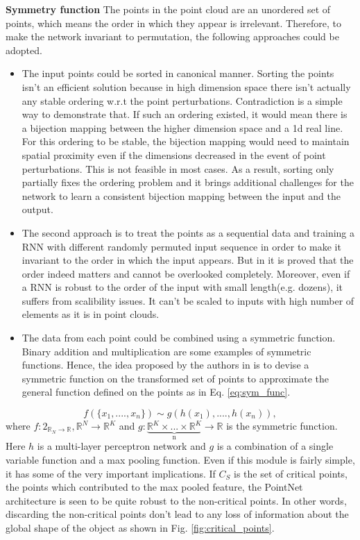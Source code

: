\textbf{Symmetry function} The points in the point cloud are an unordered set of points, which means the order in which they appear is irrelevant. Therefore, to make the network invariant to permutation, the following approaches could be adopted. 
\begin{itemize}
    \item The input points could be sorted in canonical manner. Sorting the points isn't an efficient solution because in high dimension space there isn't actually any stable ordering w.r.t the point perturbations. Contradiction is a simple way to demonstrate that. If such an ordering existed, it would mean there is a bijection mapping between the higher dimension space and a 1d real line. For this ordering to be stable, the bijection mapping would need to maintain spatial proximity even if the dimensions decreased in the event of point perturbations. This is not feasible in most cases. As a result, sorting only partially fixes the ordering problem and it brings additional challenges for the network to learn a consistent bijection mapping between the input and the output.\cite{mei2022unsupervised}
    \item The second approach is to treat the points as a sequential data and training a \ac{RNN} with different randomly permuted input sequence in order to make it invariant to the order in which the input appears. But in \cite{vinyals2015order} it is proved that the order indeed matters and cannot be overlooked completely. Moreover, even if a \ac{RNN} is robust to the order of the input with small length(e.g. dozens), it suffers from scalibility issues. It can't be scaled to inputs with high number of elements as it is in point clouds.\cite{mei2022unsupervised}
    \item The data from each point could be combined using a symmetric function. Binary addition and multiplication are some examples of symmetric functions. Hence, the idea proposed by the authors in \cite{qi2017pointnet} is to devise a symmetric function on the transformed set of points to approximate the general function defined on the points as in Eq. \ref{eq:sym_func}.\cite{mei2022unsupervised}
\end{itemize}
   
\begin{equation}
    \label{eq:sym_func}
    f(\{x_1, ...., x_n\}) \sim g(h(x_1), ...., h(x_n)),
\end{equation}
where $\mathit{f}: 2_{\mathbb{R}_{\mathit{N}} \rightarrow \mathbb{R}}, \mathbb{R}^{\mathit{N}} \rightarrow \mathbb{R}^{\mathit{K}}$ and $g: \underbrace{\mathbb{R}^{\mathit{K}} \times ... \times \mathbb{R}^{\mathit{K}}}_\text{n} \rightarrow \mathbb{R}$ is the symmetric function. Here $h$ is a multi-layer perceptron network and $g$ is a combination of a single variable function and a max pooling function. Even if this module is fairly simple, it has some of the very important implications. If $\mathit{C_S}$ is the set of critical points, the points which contributed to the max pooled feature, the PointNet architecture is seen to be quite robust to the non-critical points. In other words, discarding the non-critical points don't lead to any loss of information about the global shape of the object as shown in Fig. \ref{fig:critical_points}. 

